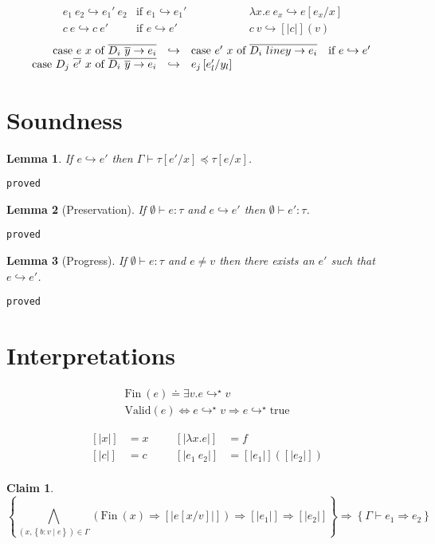 \documentclass[10pt,a4paper]{article}
\newtheorem{lemma}{Lemma}
\newtheorem{claim}{Claim}
\newcommand\showproof[1]{\texttt{proved}}
\newcommand\efun[2]{\ensuremath{\lambda #1 . #2}}
\newcommand\eapp[2]{\ensuremath{#1 \ #2}}
\newcommand\edata[2]{\ensuremath{#1 \ #2}}
\newcommand\ecase[5]{\ensuremath{\text{case}\ #1\ #2\ \text{of}\ \overline{\edata{#3}{#4} \rightarrow #5}}}
\newcommand\etrue{\ensuremath{\text{true}}}
\newcommand\tref[3]{\ensuremath{\left\lbrace {#1} \colon {#2} \mid {#3} \right\rbrace}}
\newcommand\fin[1]{\ensuremath{\text{Fin}\ (#1)}}
\newcommand\valid[1]{\ensuremath{\text{Valid}(#1)}}
\newcommand\sub[2]{\ensuremath{\left[ #2 / #1 \right]}}
\newcommand\interp[1]{\ensuremath{[|#1|]}}
\newcommand\eval[2]{\ensuremath{#1 \hookrightarrow #2}}
\newcommand\evals[2]{\ensuremath{#1 \hookrightarrow^\star #2}}
\newcommand\hastype[3]{\ensuremath{#1 \vdash #2 \colon #3}}
\newcommand\issubtype[3]{\ensuremath{#1 \vdash #2 \preceq #3}}
\newcommand\issubref[3]{\ensuremath{#1 \vdash #2 \Rightarrow #3}}
\begin{document}
$$
\begin{array}{lllll}
\eval{\eapp{e_1}{e_2}}{\eapp{e_1'}{e_2}} & \text{if } \eval{e_1}{e_1'}&\qquad\qquad&
\eval{\eapp{\efun{x}{e}}{e_x}}{e\sub{x}{e_x}} &\\
\eval{\eapp{c}{e}}{\eapp{c}{e'}} & \text{if } \eval{e}{e'} &\qquad\qquad&
\eval{\eapp{c}{v}}{[|c|](v)} &
\end{array}
$$
$$
\begin{array}{rllll}
\eval{\ecase{e}{x}{D_i}{\overline{y}}{e_i}&}
	 {&\ecase{e'}{x}{D_i}{line{y}}{e_i}} & \text{if } \eval{e}{e'} &\\
\eval	{\ecase{\eapp{D_j}{\overline{e'}}}{x}{D_i}{\overline{y}}{e_i}&}
		{&e_j\sub{y_l}{e'_l}} &
\end{array}
$$

\section*{Soundness}
\begin{lemma}\label{lemma:eval}
If \eval{e}{e'} then \issubtype{\Gamma}{\tau\sub{x}{e'}}{\tau\sub{x}{e}}.
\end{lemma}
\showproof{
	\begin{proof}
	
	\end{proof}
}

\begin{lemma}[Preservation]\label{lemma:preservation}
If \hastype{\emptyset}{e}{\tau} and \eval{e}{e'} then \hastype{\emptyset}{e'}{\tau}.
\end{lemma}
\showproof{
	\begin{proof}
	
	\end{proof}
}
\begin{lemma}[Progress]\label{lemma:progress}
If \hastype{\emptyset}{e}{\tau} and $e \neq v$ then there exists an $e'$ such that \eval{e}{e'}.
\end{lemma}
\showproof{
	\begin{proof}
	
	\end{proof}
}

\section*{Interpretations}
\begin{align*}
\fin{e} \doteq \exists v. \evals{e}{v}\\
\valid{e} \Leftrightarrow \evals{e}{v}\Rightarrow\evals{e}{\etrue}
\end{align*}

\begin{align*}
\interp{x}&=x &&&
\interp{\efun{x}{e}}&=f\\
\interp{c}&=c &&&
\interp{\eapp{e_1}{e_2}}&=\interp{e_1}(\interp{e_2})\\
\end{align*}



\begin{claim}
$$
\left\lbrace	
	\bigwedge_{(x,\tref{b}{v}{e})\in\Gamma}(\fin{x}\Rightarrow \interp{e\sub{v}{x}})
	\Rightarrow \interp{e_1}
	\Rightarrow \interp{e_2}
\right\rbrace
\Rightarrow
\left\lbrace	
\issubref{\Gamma}{e_1}{e_2}
\right\rbrace
$$
\end{claim}
\end{document}
